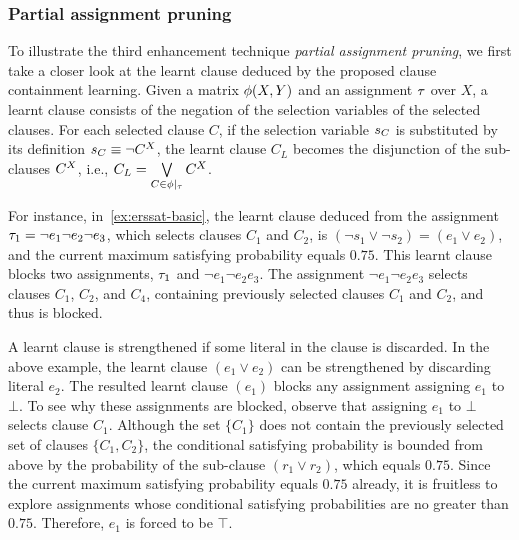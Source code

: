 \iffalse
    \begin{example}\label{ex:subsume}
        Continue Example~\ref{ex:basic}.
        Let the first tried assignment be $\tau_1=\neg e_1 \neg e_2 \neg e_3$.
        It selects $C_1$ and $C_2$.
        Because $C_1^Y$ subsumes $C_2^Y$, $C_2$ is removed from $\phi|_{\tau_1}$, yielding $\varphi=C_1$.
        The weighted model counter gives $\Pr[\invR^{0.5}Y.\varphi]=0.75$, and the learnt clause $C_L=(\neg s_1)$ is conjoined with $\psi$ to prevent $C_1$ being selected again.
        Compared to Example~\ref{ex:basic}, with the help of clause subsumption, the learnt clause $(\neg s_1)$ deduced from $\tau_1$ is stronger than its counterpart $(\neg s_1 \vee \neg s_2)$ in Example~\ref{ex:basic}, and therefore avoids a fruitless trail of the assignment $\tau_2=\neg e_1 e_2 \neg e_3$.
    \end{example}
\fi

\subsubsection{Partial assignment pruning}
To illustrate the third enhancement technique \textit{partial assignment pruning},
we first take a closer look at the learnt clause deduced by the proposed clause containment learning.
Given a matrix $\phi(X,Y)$ and an assignment $\tau$ over $X$,
a learnt clause consists of the negation of the selection variables of the selected clauses.
For each selected clause $C$,
if the selection variable $s_{C}$ is substituted by its definition $s_{C}\equiv\lnot C^X$,
the learnt clause $C_L$ becomes the disjunction of the sub-clauses $C^X$,
i.e., $C_L=\bigvee\limits_{C\in\phi|_{\tau}}C^X$.

For instance, in~\cref{ex:erssat-basic},
the learnt clause deduced from the assignment $\tau_1=\lnot e_1 \lnot e_2 \lnot e_3$,
which selects clauses $C_1$ and $C_2$,
is $(\lnot s_1 \lor \lnot s_2)=(e_1 \lor e_2)$,
and the current maximum satisfying probability equals $0.75$.
This learnt clause blocks two assignments, $\tau_1$ and $\lnot e_1 \lnot e_2 e_3$.
The assignment $\lnot e_1 \lnot e_2 e_3$ selects clauses $C_1$, $C_2$, and $C_4$,
containing previously selected clauses $C_1$ and $C_2$, and thus is blocked.

A learnt clause is strengthened if some literal in the clause is discarded.
In the above example,
the learnt clause $(e_1 \lor e_2)$ can be strengthened by discarding literal $e_2$.
The resulted learnt clause $(e_1)$ blocks any assignment assigning $e_1$ to $\bot$.
To see why these assignments are blocked,
observe that assigning $e_1$ to $\bot$ selects clause $C_1$.
Although the set $\{C_1\}$ does not contain the previously selected set of clauses $\{C_1,C_2\}$,
the conditional satisfying probability is bounded from above by the probability of the sub-clause $(r_1 \lor r_2)$,
which equals $0.75$.
Since the current maximum satisfying probability equals $0.75$ already,
it is fruitless to explore assignments whose conditional satisfying probabilities are no greater than $0.75$. Therefore, $e_1$ is forced to be $\top$.

